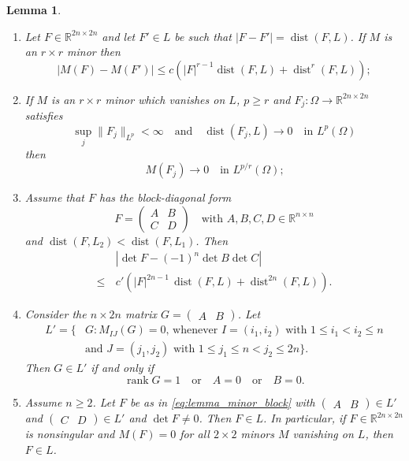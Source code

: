 \documentclass[titlepage]{amsart}
\numberwithin{equation}{section}
\theoremstyle{plain}
\newtheorem{lemma}[equation]{Lemma}
\theoremstyle{definition}
\theoremstyle{remark}
\newcommand{\ben}{\begin{enumerate}}
\newcommand{\dist}{\operatorname{dist}}
\newcommand{\een}{\end{enumerate}}
\newcommand{\R}{\mathbb{R}}
\newcommand{\rank}{\operatorname{rank}}
\begin{document}
\begin{lemma}   \label{le:minor_facts}
\ben  
\item  \label{it:le_minor_expansion}
 Let $F \in \R^{2n \times 2n}$ and let $F' \in L$ be such that 
$|F- F'| = \dist(F, L)$. If $M$ is an $r \times r$ minor then 
\begin{equation}
|M(F) - M(F')| \le c (|F|^{r-1} \dist(F, L) + \dist^r(F, L));
\end{equation}
\item   \label{it:lemma_minor_converge}
If $M$ is an $r \times r$ minor which vanishes on $L$, $p \ge r$ and  $F_j : \Omega \to \R^{2n \times 2n}$ satisfies
 $$ \sup_j \|  F_j\|_{L^p} < \infty \quad \text{and}  \quad  \dist(F_j, L) \to 0 \quad \text{in $L^p(\Omega)$} $$
  then
\begin{equation} M(F_j) \to 0 \quad \text{in $L^{p/r}(\Omega)$;}
\end{equation}
\item  \label{it:lemma_minor_off_diagonal}
Assume that  $F$ has the block-diagonal form 
\begin{equation} \label{eq:lemma_minor_block}
F =  \begin{pmatrix} A & B \\ C & D \end{pmatrix} \quad \text{with $A, B, C, D \in \R^{n \times n}$}
\end{equation}
and $\dist(F, L_2) < \dist (F, L_1)$. Then 
\begin{align} 
& \, | \det F - (-1)^n \det B \det C| \\
 \le & \,  c' (  |F|^{2n-1} \, \dist(F, L) + \dist^{2n}(F,L)). \nonumber 
\end{align}
\item  \label{it:lemma_minor_two_minors} Consider the $n \times 2n$ matrix
$G = \begin{pmatrix} A & B \end{pmatrix}$.  Let 
\begin{align} \label{eq:define_Lprime_minor}
 L' = \{ &G :  M_{IJ}(G) = 0, \, \text{whenever $I = (i_1, i_2)$ with  $1 \le i_1 < i_2 \le n$} \\
 &\text{and $J = (j_1, j_2)$ with  $1 \le j_1 \le n < j_2 \le 2n$} \}. \nonumber
 \end{align}
 Then  $ G \in L'$ if and only if 
 \begin{equation} \label{eq:vanishing_two_minors_on_L}
 \rank G = 1 \quad \text{or} \quad A = 0 \quad \text{or} \quad B=0.
 \end{equation}
\item \label{it:lemma_minor_characterization} Assume $n\geq 2$. Let $F$ be as in \eqref{eq:lemma_minor_block} with $\begin{pmatrix} A & B \end{pmatrix}\in L'$ and $\begin{pmatrix} C & D \end{pmatrix}\in L'$ and $\det F\neq 0$. Then $F\in L$. In particular, if $F\in \R^{2n\times 2n}$ is nonsingular and $M(F)=0$ for all $2\times 2$ minors $M$ vanishing on $L$, then $F\in L$.
\een
\end{lemma}
\end{document}

